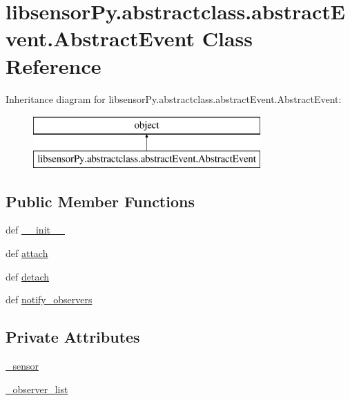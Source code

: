 \hypertarget{classlibsensorPy_1_1abstractclass_1_1abstractEvent_1_1AbstractEvent}{}\section{libsensor\+Py.\+abstractclass.\+abstract\+Event.\+Abstract\+Event Class Reference}
\label{classlibsensorPy_1_1abstractclass_1_1abstractEvent_1_1AbstractEvent}
Inheritance diagram for libsensor\+Py.\+abstractclass.\+abstract\+Event.\+Abstract\+Event\+:\begin{figure}[H]
\begin{center}
\leavevmode
\includegraphics[height=2.000000cm]{classlibsensorPy_1_1abstractclass_1_1abstractEvent_1_1AbstractEvent}
\end{center}
\end{figure}
\subsection*{Public Member Functions}
\begin{DoxyCompactItemize}
\item 
def \hyperlink{classlibsensorPy_1_1abstractclass_1_1abstractEvent_1_1AbstractEvent_a8506556fd05009c62b37ae22f0d791fb}{\+\_\+\+\_\+init\+\_\+\+\_\+}
\item 
def \hyperlink{classlibsensorPy_1_1abstractclass_1_1abstractEvent_1_1AbstractEvent_a97bd24fdfc9d340ea31017a41b69b537}{attach}
\item 
def \hyperlink{classlibsensorPy_1_1abstractclass_1_1abstractEvent_1_1AbstractEvent_a08b1a3d011fd2038a3584e80464e96a6}{detach}
\item 
def \hyperlink{classlibsensorPy_1_1abstractclass_1_1abstractEvent_1_1AbstractEvent_a7a51e61b4391c8135b8d87a8b5a8b52f}{notify\+\_\+observers}
\end{DoxyCompactItemize}
\subsection*{Private Attributes}
\begin{DoxyCompactItemize}
\item 
\hyperlink{classlibsensorPy_1_1abstractclass_1_1abstractEvent_1_1AbstractEvent_ad24952f48deebd43f7d0f181e09c48c8}{\+\_\+sensor}
\item 
\hyperlink{classlibsensorPy_1_1abstractclass_1_1abstractEvent_1_1AbstractEvent_a40c8e2a2c62b981db72b14c40b203e0e}{\+\_\+observer\+\_\+list}
\end{DoxyCompactItemize}
